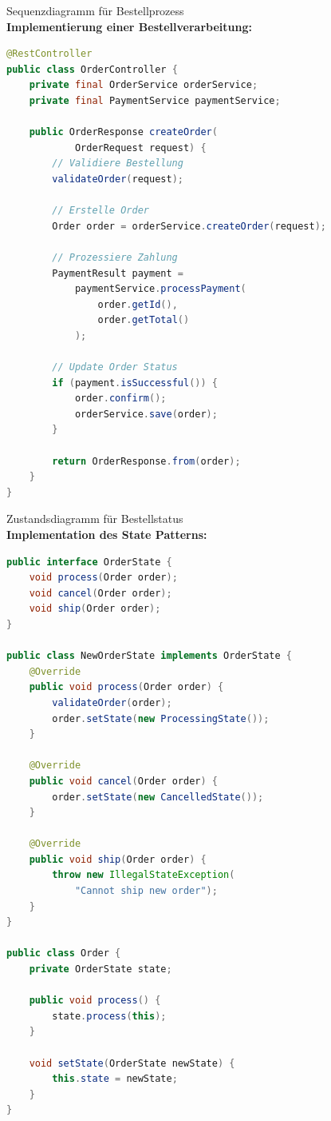 \begin{example2}{Sequenzdiagramm für Bestellprozess}\\
\textbf{Implementierung einer Bestellverarbeitung:}

\begin{lstlisting}[language=Java, style=basesmol]
@RestController
public class OrderController {
    private final OrderService orderService;
    private final PaymentService paymentService;
    
    public OrderResponse createOrder(
            OrderRequest request) {
        // Validiere Bestellung
        validateOrder(request);
        
        // Erstelle Order
        Order order = orderService.createOrder(request);
        
        // Prozessiere Zahlung
        PaymentResult payment = 
            paymentService.processPayment(
                order.getId(), 
                order.getTotal()
            );
        
        // Update Order Status
        if (payment.isSuccessful()) {
            order.confirm();
            orderService.save(order);
        }
        
        return OrderResponse.from(order);
    }
}
\end{lstlisting}
\end{example2}

\begin{example2}{Zustandsdiagramm für Bestellstatus}\\
\textbf{Implementation des State Patterns:}

\begin{lstlisting}[language=Java, style=basesmol]
public interface OrderState {
    void process(Order order);
    void cancel(Order order);
    void ship(Order order);
}

public class NewOrderState implements OrderState {
    @Override
    public void process(Order order) {
        validateOrder(order);
        order.setState(new ProcessingState());
    }
    
    @Override
    public void cancel(Order order) {
        order.setState(new CancelledState());
    }
    
    @Override
    public void ship(Order order) {
        throw new IllegalStateException(
            "Cannot ship new order");
    }
}

public class Order {
    private OrderState state;
    
    public void process() {
        state.process(this);
    }
    
    void setState(OrderState newState) {
        this.state = newState;
    }
}
\end{lstlisting}
\end{example2}

